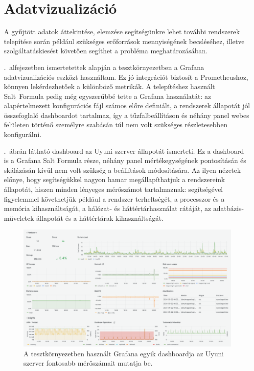 \begin{figure}[ht]
	
\end{figure}


\section{Adatvizualizáció}
A gyűjtött adatok áttekintése, elemzése segítségünkre lehet további rendszerek telepítése során például szükséges erőforrások mennyiségének becsléséhez, illetve szolgáltatáskiesést követően segíthet a probléma meghatározásában.

.~alfejezetben ismertetettek alapján a tesztkörnyezetben a Grafana adatvizualizációs eszközt használtam. Ez jó integrációt biztosít a Prometheushoz, könnyen lekérdezhetőek a különböző metrikák. A telepítéshez használt Salt~Formula pedig még egyszerűbbé tette a Grafana használatát: az alapértelmezett konfigurációs fájl számos előre definiált, a rendszerek állapotát jól összefoglaló dashboardot tartalmaz, így a tűzfalbeállításon és néhány panel webes felületen történő személyre szabásán túl nem volt szükséges részletesebben konfigurálni.

.~ábrán látható dashboard az Uyuni szerver állapotát ismerteti. Ez a dashboard is a Grafana Salt Formula része, néhány panel mértékegységének pontosításán és skálázásán kívül nem volt szükség a beállítások módosítására. Az ilyen nézetek előnye, hogy segítségükkel nagyon hamar megállapíthatjuk a rendszereink állapotát, hiszen minden lényeges mérőszámot tartalmaznak: segítségével figyelemmel követhetjük például a rendszer terheltségét, a processzor és a memória kihasználtságát, a hálózat- és háttértárhasználat rátáját, az adatbázis-műveletek állapotát és a háttértárak kihasználtságát.

\begin{figure}[ht]
	\centering
	\includegraphics[width=15cm]{figures/grafana-uyuni-server.png}
	\caption{A tesztkörnyezetben használt Grafana egyik dashboardja az Uyuni szerver fontosabb mérőszámait mutatja be.}
	\label{fig:grafana-uyuni-server}
\end{figure}

